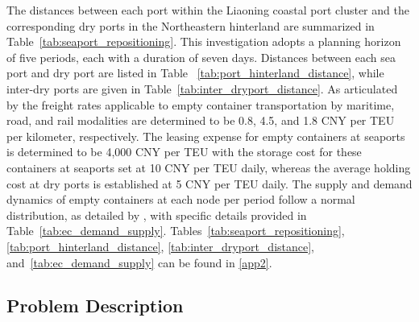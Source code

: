 \documentclass[preprint,12pt]{elsarticle}
\begin{document}
The distances between each port within the Liaoning coastal port cluster and the corresponding dry ports in the Northeastern hinterland are summarized in Table~\ref{tab:seaport_repositioning}. This investigation adopts a planning horizon of five periods, each with a duration of  seven days. Distances between each sea port and dry port are listed in Table ~\ref{tab:port_hinterland_distance}, while inter-dry ports are given in Table~\ref{tab:inter_dryport_distance}. As articulated by \cite{caiJointOptimizationEmpty2024} the freight rates applicable to empty container transportation by maritime, road, and rail modalities are determined to be 0.8, 4.5, and 1.8 CNY per TEU per kilometer, respectively. The leasing expense for empty containers at seaports is determined to be 4,000 CNY per TEU with the storage cost for these containers at seaports set at 10 CNY per TEU daily, whereas the average holding cost at dry ports is established at 5 CNY per TEU daily. The supply and demand dynamics of empty containers at each node per period follow a normal distribution, as detailed by \cite{caiJointOptimizationEmpty2024}, with specific details provided in Table~\ref{tab:ec_demand_supply}. Tables~\ref{tab:seaport_repositioning}, \ref{tab:port_hinterland_distance}, \ref{tab:inter_dryport_distance}, and~\ref{tab:ec_demand_supply} can be found in \ref{app2}.


\subsection{Problem Description}
\end{document}
